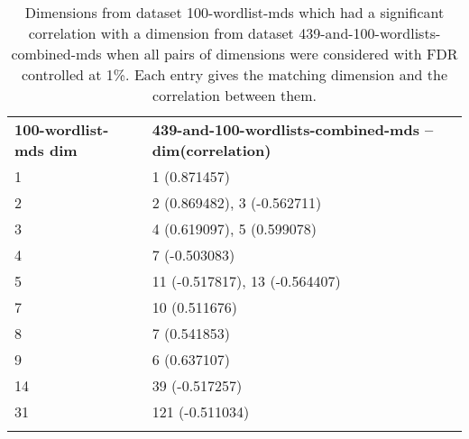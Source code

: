 \begin{longtable}[!htbp]{| ll |}
    \hline
    \textbf{100-wordlist-mds dim} & \textbf{439-and-100-wordlists-combined-mds -- dim(correlation)}\\
    1 & 1 (0.871457)\\
    2 & 2 (0.869482), 3 (-0.562711)\\
    3 & 4 (0.619097), 5 (0.599078)\\
    4 & 7 (-0.503083)\\
    5 & 11 (-0.517817), 13 (-0.564407)\\
    7 & 10 (0.511676)\\
    8 & 7 (0.541853)\\
    9 & 6 (0.637107)\\
    14 & 39 (-0.517257)\\
    31 & 121 (-0.511034)\\
    \hline
    \caption{Dimensions from dataset 100-wordlist-mds which had a significant correlation with a dimension from dataset 439-and-100-wordlists-combined-mds when all pairs of dimensions were considered with FDR controlled at 1\%. Each entry gives the matching dimension and the correlation between them.} \label{100-vs-439and100-from-800dim-lowercase-wmt-model-significant.tex}\\
\end{longtable}
